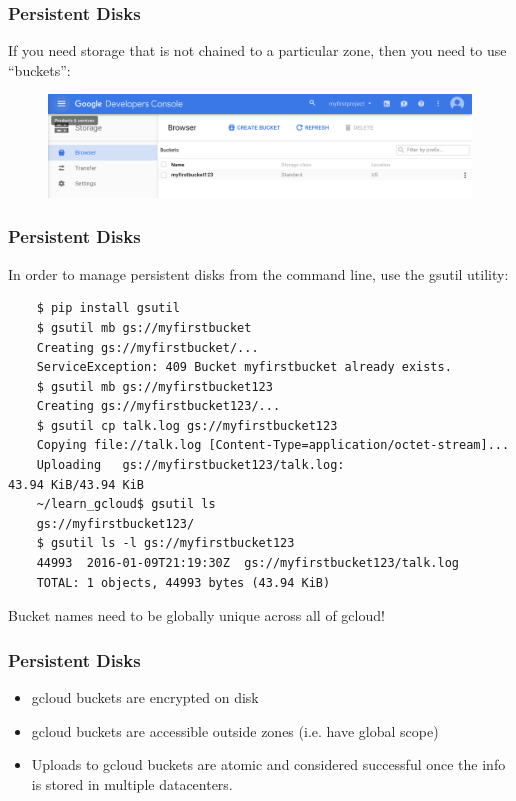 \documentclass[9pt]{beamer}
\begin{document}
\begin{frame}[fragile]
  \frametitle{Persistent Disks}
  If you need storage that is not chained to a particular zone, then you need to use ``buckets'':
  \begin{figure}
    \includegraphics[scale=0.2]{figures/Buckets.png}
  \end{figure}
\end{frame}

\begin{frame}[fragile]
  \frametitle{Persistent Disks}
  In order to manage persistent disks from the command line, use the gsutil utility:
  \begin{verbatim}
    $ pip install gsutil
    $ gsutil mb gs://myfirstbucket
    Creating gs://myfirstbucket/...
    ServiceException: 409 Bucket myfirstbucket already exists.
    $ gsutil mb gs://myfirstbucket123
    Creating gs://myfirstbucket123/...
    $ gsutil cp talk.log gs://myfirstbucket123
    Copying file://talk.log [Content-Type=application/octet-stream]...
    Uploading   gs://myfirstbucket123/talk.log:                      43.94 KiB/43.94 KiB
    ~/learn_gcloud$ gsutil ls
    gs://myfirstbucket123/
    $ gsutil ls -l gs://myfirstbucket123
    44993  2016-01-09T21:19:30Z  gs://myfirstbucket123/talk.log
    TOTAL: 1 objects, 44993 bytes (43.94 KiB)
  \end{verbatim}
  Bucket names need to be globally unique across all of gcloud!
\end{frame}

\begin{frame}[fragile]
  \frametitle{Persistent Disks}
  \begin{itemize}
  \item gcloud buckets are encrypted on disk
  \item gcloud buckets are accessible outside zones (i.e. have global scope)
  \item Uploads to gcloud buckets are atomic and considered successful once the info is stored in multiple datacenters.
  \end{itemize}
\end{frame}
\end{document}
